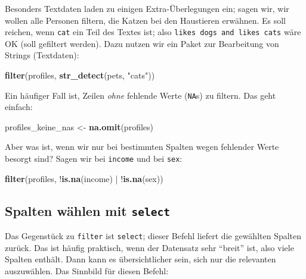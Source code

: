 \documentclass[12pt,]{book}
\newenvironment{Shaded}{\begin{snugshade}}{\end{snugshade}}
\newcommand{\KeywordTok}[1]{\textcolor[rgb]{0.13,0.29,0.53}{\textbf{{#1}}}}
\newcommand{\StringTok}[1]{\textcolor[rgb]{0.31,0.60,0.02}{{#1}}}
\newcommand{\NormalTok}[1]{{#1}}
\begin{document}
Besonders Textdaten laden zu einigen Extra-Überlegungen ein; sagen wir,
wir wollen alle Personen filtern, die Katzen bei den Haustieren
erwähnen. Es soll reichen, wenn \texttt{cat} ein Teil des Textes ist;
also \texttt{likes\ dogs\ and\ likes\ cats} wäre OK (soll gefiltert
werden). Dazu nutzen wir ein Paket zur Bearbeitung von Strings
(Textdaten):

\begin{Shaded}
\begin{Highlighting}[]

\KeywordTok{filter}\NormalTok{(profiles, }\KeywordTok{str_detect}\NormalTok{(pets, }\StringTok{"cats"}\NormalTok{))}
\end{Highlighting}
\end{Shaded}

Ein häufiger Fall ist, Zeilen \emph{ohne} fehlende Werte (\texttt{NA}s)
zu filtern. Das geht einfach:

\begin{Shaded}
\begin{Highlighting}[]
\NormalTok{profiles_keine_nas <-}\StringTok{ }\KeywordTok{na.omit}\NormalTok{(profiles)}
\end{Highlighting}
\end{Shaded}

Aber was ist, wenn wir nur bei bestimmten Spalten wegen fehlender Werte
besorgt sind? Sagen wir bei \texttt{income} und bei \texttt{sex}:

\begin{Shaded}
\begin{Highlighting}[]
\KeywordTok{filter}\NormalTok{(profiles, !}\KeywordTok{is.na}\NormalTok{(income) |}\StringTok{ }\NormalTok{!}\KeywordTok{is.na}\NormalTok{(sex))}
\end{Highlighting}
\end{Shaded}

\subsection{\texorpdfstring{Spalten wählen mit
\texttt{select}}{Spalten wählen mit select}}\label{spalten-wahlen-mit-select}

Das Gegenstück zu \texttt{filter} ist \texttt{select}; dieser Befehl
liefert die gewählten Spalten zurück. Das ist häufig praktisch, wenn der
Datensatz sehr ``breit'' ist, also viele Spalten enthält. Dann kann es
übersichtlicher sein, sich nur die relevanten auszuwählen. Das Sinnbild
für diesen Befehl:
\end{document}
